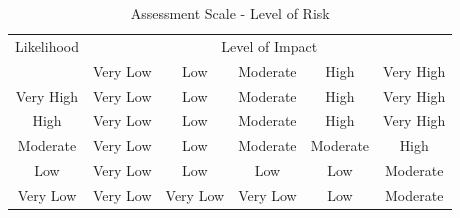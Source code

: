 \documentclass{article}
\begin{document}
\begin{table}[h]\begin{center}
    \begin{tabular}{c | c | c | c | c | c}
Likelihood & \multicolumn{5}{c}{Level of Impact} \\
 & Very Low & Low & Moderate & High & Very High \\
\hline
Very High & Very Low & Low &  Moderate & High &  Very High \\
High & Very Low & Low & Moderate & High & Very High \\
Moderate & Very Low & Low & Moderate & Moderate & High \\
Low & Very Low & Low & Low & Low & Moderate \\
Very Low & Very Low & Very Low & Very Low & Low & Moderate \\
    \end{tabular}
    \caption{Assessment Scale - Level of Risk  \citep[page I-1]{national_institute_of_standards_and_technology_nist_2012}}
    \label{national_institute_of_standards_and_technology_nist_2012_assessment_scale}
\end{center} \end{table}
\end{document}
